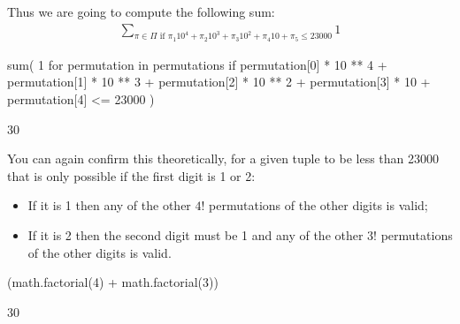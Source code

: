 Thus we are going to compute the following sum:
\begin{equation*}
\begin{split}
    \sum_{\pi \in \Pi \text{ if }\pi_1 10 ^ 4 + \pi_2 10 ^ 3 + \pi_3 10 ^ 2 + \pi_4 10 + \pi_5 \leq 23000} 1
\end{split}
\end{equation*}



\begin{pyin}
sum(
    1
    for permutation in permutations
    if permutation[0] * 10 ** 4
    + permutation[1] * 10 ** 3
    + permutation[2] * 10 ** 2
    + permutation[3] * 10
    + permutation[4]
    <= 23000
)
\end{pyin}





\begin{raw}
30
\end{raw}





You can again confirm this theoretically, for a given tuple to be less than 23000
that is only possible if the first digit is 1 or 2:
\begin{itemize}
\item 

If it is 1 then any of the other \(4!\) permutations of the other digits is
valid;

\item 

If it is 2 then the second digit must be 1 and any of the other \(3!\)
permutations of the other digits is valid.

\end{itemize}




\begin{pyin}
(math.factorial(4) + math.factorial(3))
\end{pyin}





\begin{raw}
30
\end{raw}






